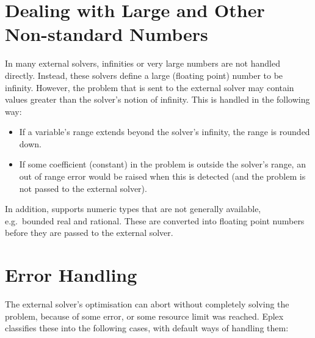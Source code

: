 \section{Dealing with Large and Other Non-standard Numbers}

In many external solvers, infinities or very large numbers are not handled
directly. Instead, these solvers define a large (floating point) number to
be infinity. However, the problem that is sent to the external solver may
contain values greater than the solver's notion of infinity. This is
handled in the following way:

\begin{itemize}
\item If a variable's range extends beyond the solver's infinity, the range
is rounded down. 
\item If some coefficient (constant) in the problem is outside the solver's
range, an out of range error would be raised when this is detected (and the
problem is not passed to the external solver).
\end{itemize}

In addition, {\eclipse} supports numeric types that are not generally
available, e.g.\ bounded real and rational. These are converted into
floating point numbers before they are passed to the external solver.

\section{Error Handling}

The external solver's optimisation can abort without completely solving the
problem, because of some error, or some resource limit was reached. Eplex
classifies these into the following cases, with default ways of handling them:

